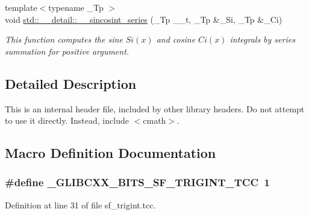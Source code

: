 \begin{DoxyCompactItemize}
{\footnotesize template$<$typename \+\_\+\+Tp $>$ }\\void \hyperlink{namespacestd_1_1____detail_aea85e0044476065ed4a067f1aa9647cb}{std\+::\+\_\+\+\_\+detail\+::\+\_\+\+\_\+sincosint\+\_\+series} (\+\_\+\+Tp \+\_\+\+\_\+t, \+\_\+\+Tp \&\+\_\+\+Si, \+\_\+\+Tp \&\+\_\+\+Ci)
\begin{DoxyCompactList}\small\item\em This function computes the sine $ Si(x) $ and cosine $ Ci(x) $ integrals by series summation for positive argument. \end{DoxyCompactList}\end{DoxyCompactItemize}


\subsection{Detailed Description}
This is an internal header file, included by other library headers. Do not attempt to use it directly. Instead, include $<$cmath$>$. 

\subsection{Macro Definition Documentation}
\subsubsection[{\texorpdfstring{\+\_\+\+G\+L\+I\+B\+C\+X\+X\+\_\+\+B\+I\+T\+S\+\_\+\+S\+F\+\_\+\+T\+R\+I\+G\+I\+N\+T\+\_\+\+T\+CC}{_GLIBCXX_BITS_SF_TRIGINT_TCC}}]{\setlength{\rightskip}{0pt plus 5cm}\#define \+\_\+\+G\+L\+I\+B\+C\+X\+X\+\_\+\+B\+I\+T\+S\+\_\+\+S\+F\+\_\+\+T\+R\+I\+G\+I\+N\+T\+\_\+\+T\+CC~1}\hypertarget{sf__trigint_8tcc_a8ba3ab1895ab4f89f7ee4d01d6db906e}{}\label{sf__trigint_8tcc_a8ba3ab1895ab4f89f7ee4d01d6db906e}


Definition at line 31 of file sf\+\_\+trigint.\+tcc.

